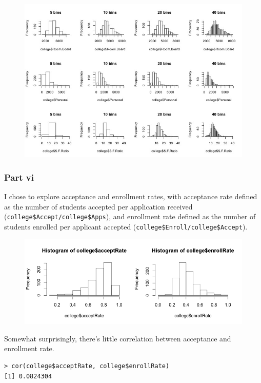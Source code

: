 \documentclass[11pt]{article}
\begin{document}
\begin{figure}[H]
	\centering
	\includegraphics[width=6.5in]{8cv.jpeg}
\end{figure}

\subsubsection*{Part vi}

I chose to explore acceptance and enrollment rates, with acceptance rate defined as the number of students accepted per application received (\texttt{college\$Accept/college\$Apps}), and enrollment rate defined as the number of students enrolled per applicant accepted (\texttt{college\$Enroll/college\$Accept}).

\begin{figure}[H]
	\centering
	\includegraphics[width=5.5in]{8cvi_histograms.png}
\end{figure}

Somewhat surprisingly, there's little correlation between acceptance and enrollment rate.
\begin{verbatim}
> cor(college$acceptRate, college$enrollRate)
[1] 0.0824304
\end{verbatim}
\end{document}
